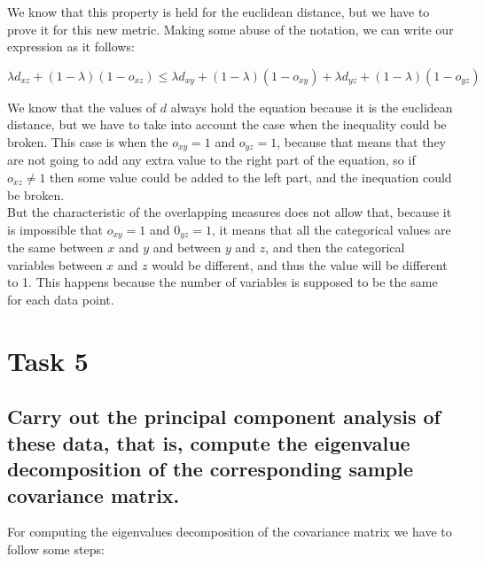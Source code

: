\documentclass[12pt]{article}
\begin{document}
We know that this property is held for the euclidean distance, but we have to prove it for this new metric. Making some abuse of the notation, we can write our expression as it follows:

\begin{equation}
    \lambda d_{xz} + (1-\lambda)(1-o_{xz}) \leq \lambda d_{xy} + (1-\lambda)(1-o_{xy}) + \lambda d_{yz} + (1-\lambda)(1-o_{yz}) 
\end{equation}

We know that the values of $d$ always hold the equation because it is the euclidean distance, but we have to take into account the case when the inequality could be broken. This case is when the $o_{xy}=1$ and $o_{yz}=1$, because that means that they are not going to add any extra value to the right part of the equation, so if $o_{xz} \neq 1$ then some value could be added to the left part, and the inequation could be broken. \\

But the characteristic of the overlapping measures does not allow that, because it is impossible that $o_{xy}=1$ and $0_{yz}=1$, it means that all the categorical values are the same between $x$ and $y$ and between $y$ and $z$, and then the categorical variables between $x$ and $z$ would be different, and thus the value will be different to 1. This happens because the number of variables is supposed to be the same for each data point.

\section{Task 5}

\subsection{ Carry out the principal component analysis of these data, that is, compute the eigenvalue decomposition of the corresponding sample covariance matrix.}

For computing the eigenvalues decomposition of the covariance matrix we have to follow some steps:
\end{document}
